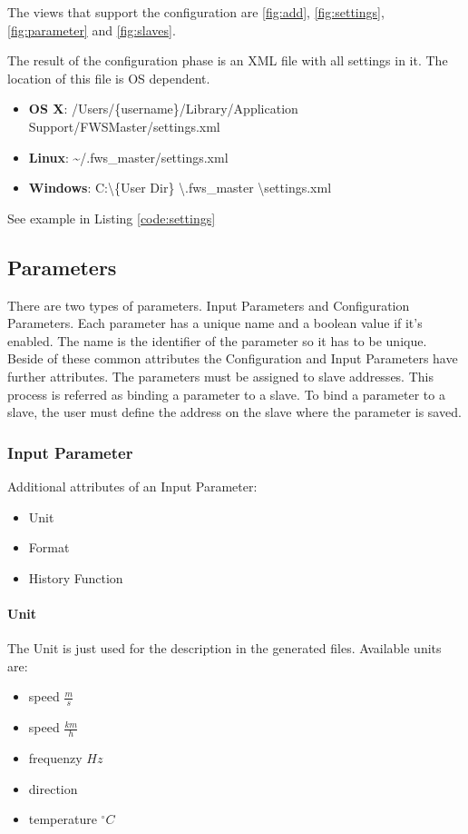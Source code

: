 The views that support the configuration are \ref{fig:add}, \ref{fig:settings}, \ref{fig:parameter} and \ref{fig:slaves}.

The result of the configuration phase is an XML file with all settings in it. The location of this file is OS dependent. 
\begin{itemize}
    \item \textbf{OS X}: /Users/\{username\}/Library/Application Support/FWSMaster/settings.xml
    \item \textbf{Linux}: \textasciitilde /.fws\_master/settings.xml
    \item \textbf{Windows}: C:\textbackslash \{User Dir\} \textbackslash .fws\_master \textbackslash settings.xml
\end{itemize}

See example in Listing \ref{code:settings}

{\C  }

\subsection{Parameters} %
\label{sub:parameters}
There are two types of parameters. Input Parameters and Configuration Parameters. Each parameter has a unique name and a boolean value if it's enabled. The name is the identifier of the parameter so it has to be unique. Beside of these common attributes the Configuration and Input Parameters have further attributes. The parameters must be assigned to slave addresses. This process is referred as binding a parameter to a slave. To bind a parameter to a slave, the user must define the address on the slave where the parameter is saved.

\subsubsection{Input Parameter} %
\label{ssub:input_parameter}
Additional attributes of an Input Parameter:
\begin{itemize}
	\item Unit
	\item Format
	\item History Function
\end{itemize}

\paragraph{Unit} %
\label{par:unit}
The Unit is just used for the description in the generated files. Available units are:
\begin{itemize}
	\item speed $\frac{m}{s}$
	\item speed $\frac{km}{h}$
	\item frequenzy $Hz$
	\item direction
	\item temperature $^\circ C$
\end{itemize}

